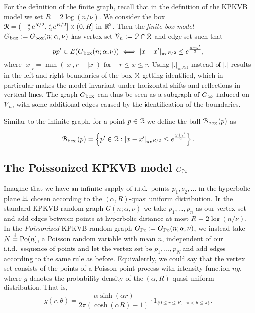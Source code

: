 For the definition of the finite graph, recall that in the definition of the KPKVB model we set $R = 2\log(n/\nu)$.
We consider the box ${\mathcal R} = (-\frac{\pi}{2}e^{R/2}, \frac{\pi}{2}e^{R/2}] \times (0, R]$ in ${\mathbb R}^2$. 
Then the \emph{finite box model} $G_{\text{box}} := G_{\text{box}}(n;\alpha, \nu)$ has vertex set $\mathcal{V}_n := \mathcal{P} \cap {\mathcal R}$ and edge set such that
\[
	pp' \in E(G_{\text{box}}(n;\alpha, \nu)) \iff |x - x'|_{\pi e^{R/2}} \leq e^{\frac{y + y'}{2}},
\]
where $|x|_{r} = \min( |x|, r - |x|)$ for $-r\leq x\leq r$. 
Using $|.|_{\pi e^{R/2}}$ instead of $|.|$ results in the left and right boundaries of the box ${\mathcal R}$ getting 
identified, which in particular 
makes the model invariant under horizontal shifts and reflections in vertical lines. 
The graph $G_{\text{box}}$ can thus be seen as a subgraph of $G_{\infty}$ induced on $\mathcal{V}_n$, with some additional edges caused by 
the identification of the boundaries.

Similar to the infinite graph, for a point $p \in {\mathcal R}$ we define the ball ${\mathcal B}_{\text{box}}\left(p\right)$ as

\begin{equation}\label{eq:def_ball_P_n}
	{\mathcal B}_{\text{box}}\left(p\right) = 
	\left\{p' \in {\mathcal R} : |x - x'|_{\pi e^{R/2}} \leq e^{\frac{y + y'}{2}}\right\}.
\end{equation}


\subsection{The Poissonized KPKVB model $G_{\text{Po}}$}


Imagine that we have an infinite supply of i.i.d.~points $p_1, p_2, \dots$ in the hyperbolic plane ${\mathbb H}$ chosen according to the $(\alpha, R)$-quasi uniform distribution. In the standard KPKVB random graph $G(n;\alpha,\nu)$ we take $p_1,\dots, p_n$ as our vertex set and add edges between points at hyperbolic distance at most $R = 2\log(n/\nu)$. In the {\em Poissonized} KPKVB random graph $G_{\text{Po}} := G_{\text{Po}}(n;\alpha,\nu)$, we instead take $N\stackrel{\text{d}}{=} {\mathrm{Po}}(n)$, a Poisson random variable 
with mean $n$, independent of our i.i.d.~sequence of points and let the vertex set be $p_1,\dots, p_N$ and add edges 
according to the same rule as before. Equivalently, we could say that the vertex set consists of the points of a Poisson point process with intensity function $n g$, where $g$ denotes the probability density of the $(\alpha,R)$-quasi uniform distribution. That is,
\[
	g(r,\theta) = \frac{\alpha\sinh(\alpha r)}{2\pi(\cosh(\alpha R) - 1)} \cdot 1_{\{0\leq r\leq R, -\pi<\theta\leq \pi\}}.
\] 

